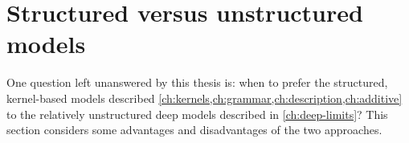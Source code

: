 





\section{Structured versus unstructured models}

One question left unanswered by this thesis is: when to prefer the structured, kernel-based models described \cref{ch:kernels,ch:grammar,ch:description,ch:additive} to the relatively unstructured deep \gp{} models described in \cref{ch:deep-limits}?
This section considers some advantages and disadvantages of the two approaches.

